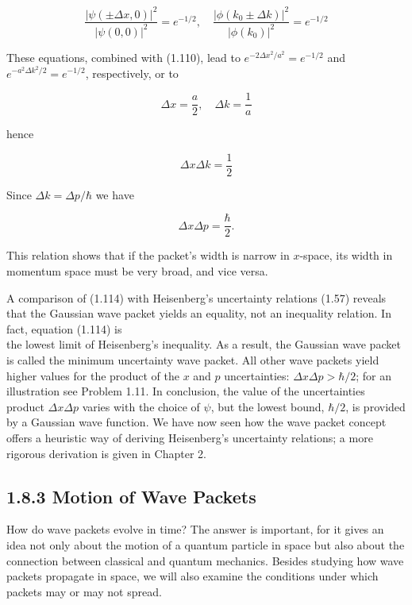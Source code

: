 \documentclass[10pt]{article}
\begin{document}
\begin{equation*}
\frac{|\psi( \pm \Delta x, 0)|^{2}}{|\psi(0,0)|^{2}}=e^{-1 / 2}, \quad \frac{\left|\phi\left(k_{0} \pm \Delta k\right)\right|^{2}}{\left|\phi\left(k_{0}\right)\right|^{2}}=e^{-1 / 2} \tag{1.111}
\end{equation*}


These equations, combined with (1.110), lead to $e^{-2 \Delta x^{2} / a^{2}}=e^{-1 / 2}$ and $e^{-a^{2} \Delta k^{2} / 2}=e^{-1 / 2}$, respectively, or to


\begin{equation*}
\Delta x=\frac{a}{2}, \quad \Delta k=\frac{1}{a} \tag{1.112}
\end{equation*}


hence


\begin{equation*}
\Delta x \Delta k=\frac{1}{2} \tag{1.113}
\end{equation*}


Since $\Delta k=\Delta p / \hbar$ we have


\begin{equation*}
\Delta x \Delta p=\frac{\hbar}{2} . \tag{1.114}
\end{equation*}


This relation shows that if the packet's width is narrow in $x$-space, its width in momentum space must be very broad, and vice versa.

A comparison of (1.114) with Heisenberg's uncertainty relations (1.57) reveals that the Gaussian wave packet yields an equality, not an inequality relation. In fact, equation (1.114) is\\
the lowest limit of Heisenberg's inequality. As a result, the Gaussian wave packet is called the minimum uncertainty wave packet. All other wave packets yield higher values for the product of the $x$ and $p$ uncertainties: $\Delta x \Delta p>\hbar / 2$; for an illustration see Problem 1.11. In conclusion, the value of the uncertainties product $\Delta x \Delta p$ varies with the choice of $\psi$, but the lowest bound, $\hbar / 2$, is provided by a Gaussian wave function. We have now seen how the wave packet concept offers a heuristic way of deriving Heisenberg's uncertainty relations; a more rigorous derivation is given in Chapter 2.

\subsection*{1.8.3 Motion of Wave Packets}
How do wave packets evolve in time? The answer is important, for it gives an idea not only about the motion of a quantum particle in space but also about the connection between classical and quantum mechanics. Besides studying how wave packets propagate in space, we will also examine the conditions under which packets may or may not spread.
\end{document}
